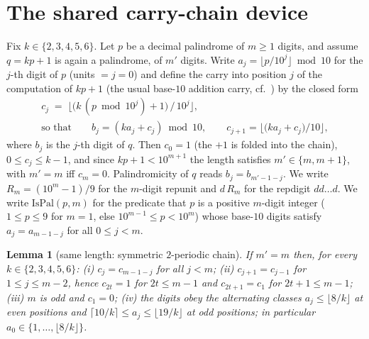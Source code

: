 
\theoremstyle{plain}
\newtheorem{theorem}{Theorem}
\newtheorem{lemma}[theorem]{Lemma}
\newtheorem{corollary}[theorem]{Corollary}
\newtheorem{question}[theorem]{Question}
\theoremstyle{remark}
\newtheorem{remark}[theorem]{Remark}
\providecommand{\IsPal}{\mathrm{IsPal}}

\section{The shared carry-chain device}
\label{sec:carry}

Fix $k \in \{2,3,4,5,6\}$. Let $p$ be a decimal
palindrome of $m \ge 1$ digits, and assume $q = kp+1$ is
again a palindrome, of $m'$ digits. Write
$a_j = \lfloor p/10^j \rfloor \bmod 10$ for the $j$-th
digit of $p$ (units $= j = 0$) and define the carry into
position $j$ of the computation of $kp+1$ (the usual
base-$10$ addition carry, cf.~\cite{holte}) by the closed
form
\begin{gather*}
 c_j \;=\; \bigl\lfloor\bigl(k\,(p \bmod 10^j) + 1\bigr)\,
 \big/\,10^j\bigr\rfloor ,
 \\
 \text{so that}\qquad
 b_j = (k a_j + c_j) \bmod 10 ,
 \qquad c_{j+1} = \bigl\lfloor\bigl(k a_j + c_j\bigr)\big/10
 \bigr\rfloor ,
\end{gather*}
where $b_j$ is the $j$-th digit of $q$. Then $c_0 = 1$
(the $+1$ is folded into the chain), $0 \le c_j \le k-1$,
and since $kp+1 < 10^{m+1}$ the length satisfies
$m' \in \{m, m+1\}$, with $m' = m$ iff $c_m = 0$.
Palindromicity of $q$ reads $b_j = b_{m'-1-j}$. We write
$R_m = (10^m-1)/9$ for the $m$-digit repunit and
$d\,R_m$ for the repdigit $dd\dots d$. We write
$\IsPal(p,m)$ for the predicate that $p$ is a positive
$m$-digit integer ($1 \le p \le 9$ for $m = 1$, else
$10^{m-1} \le p < 10^m$) whose base-$10$ digits satisfy
$a_j = a_{m-1-j}$ for all $0 \le j < m$.

\begin{lemma}[same length: symmetric $2$-periodic chain]
\label{lem:same}
If $m' = m$ then, for every $k \in \{2,3,4,5,6\}$:
\emph{(i)} $c_j = c_{m-1-j}$ for all $j < m$;
\emph{(ii)} $c_{j+1} = c_{j-1}$ for $1 \le j \le m-2$,
hence $c_{2t} = 1$ for $2t \le m-1$ and
$c_{2t+1} = c_1$ for $2t+1 \le m-1$;
\emph{(iii)} $m$ is odd and $c_1 = 0$;
\emph{(iv)} the digits obey the alternating classes
$a_j \le \lfloor 8/k \rfloor$ at even positions and
$\lceil 10/k \rceil \le a_j \le \lfloor 19/k \rfloor$ at
odd positions; in particular
$a_0 \in \{1,\dots,\lfloor 8/k \rfloor\}$.
\end{lemma}

